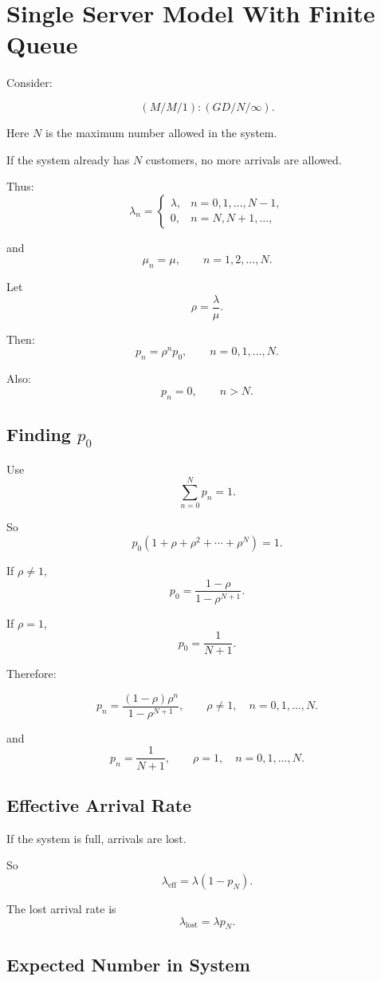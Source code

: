 \documentclass[12pt]{article}
\begin{document}
\section{Single Server Model With Finite Queue}

Consider:

\[
(M/M/1):(GD/N/\infty).
\]

Here \(N\) is the maximum number allowed in the system.

If the system already has \(N\) customers, no more arrivals are allowed.

Thus:
\[
\lambda_n=
\begin{cases}
\lambda, & n=0,1,\ldots,N-1,\\
0, & n=N,N+1,\ldots,
\end{cases}
\]

and
\[
\mu_n=\mu,\qquad n=1,2,\ldots,N.
\]

Let
\[
\rho=\frac{\lambda}{\mu}.
\]

Then:
\[
p_n=\rho^np_0,\qquad n=0,1,\ldots,N.
\]

Also:
\[
p_n=0,\qquad n>N.
\]

\subsection*{Finding \(p_0\)}

Use
\[
\sum_{n=0}^{N}p_n=1.
\]

So
\[
p_0(1+\rho+\rho^2+\cdots+\rho^N)=1.
\]

If \(\rho\neq 1\),
\[
\boxed{
p_0=\frac{1-\rho}{1-\rho^{N+1}}.
}
\]

If \(\rho=1\),
\[
\boxed{
p_0=\frac{1}{N+1}.
}
\]

Therefore:

\[
\boxed{
p_n=
\frac{(1-\rho)\rho^n}{1-\rho^{N+1}},
\qquad \rho\neq 1,\quad n=0,1,\ldots,N.
}
\]

and
\[
\boxed{
p_n=\frac{1}{N+1},
\qquad \rho=1,\quad n=0,1,\ldots,N.
}
\]

\subsection*{Effective Arrival Rate}

If the system is full, arrivals are lost.

So
\[
\boxed{
\lambda_{\text{eff}}=\lambda(1-p_N).
}
\]

The lost arrival rate is
\[
\boxed{
\lambda_{\text{lost}}=\lambda p_N.
}
\]

\subsection*{Expected Number in System}
\end{document}

